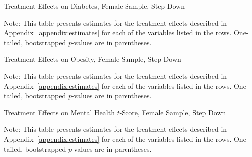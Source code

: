 	\begin{table}[H]
     \caption{Treatment Effects on Diabetes, Female Sample, Step Down}
     \label{table:abccare_rslt_female_cat14_sd}
	
	\end{table} 
\begin{spacing}{1}
\begin{footnotesize}
\noindent Note: This table presents estimates for the treatment effects described in Appendix~\ref{appendix:estimates} for each of the variables listed in the rows.  One-tailed, bootstrapped $p$-values are in parentheses.
\end{footnotesize}
\end{spacing}

	\begin{table}[H]
     \caption{Treatment Effects on Obesity, Female Sample, Step Down}
     \label{table:abccare_rslt_female_cat15_sd}
	
	\end{table} 
\begin{spacing}{1}
\begin{footnotesize}
\noindent Note: This table presents estimates for the treatment effects described in Appendix~\ref{appendix:estimates} for each of the variables listed in the rows.  One-tailed, bootstrapped $p$-values are in parentheses.
\end{footnotesize}
\end{spacing}

	\begin{table}[H]
     \caption{Treatment Effects on Mental Health $t$-Score, Female Sample, Step Down}
     \label{table:abccare_rslt_female_cat16_sd}
	
	\end{table} 
\begin{spacing}{1}
\begin{footnotesize}
\noindent Note: This table presents estimates for the treatment effects described in Appendix~\ref{appendix:estimates} for each of the variables listed in the rows.  One-tailed, bootstrapped $p$-values are in parentheses.
\end{footnotesize}
\end{spacing}

\clearpage

